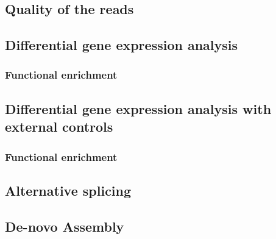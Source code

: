\subsection{Quality of the reads}
\subsection{Differential gene expression analysis}
\subsubsection{Functional enrichment}
\subsection{Differential gene expression analysis with external controls}
\subsubsection{Functional enrichment}
\subsection{Alternative splicing}
\subsection{De-novo Assembly}